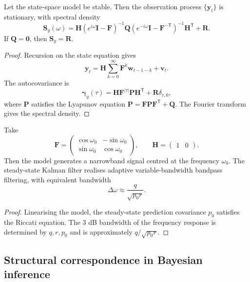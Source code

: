 \begin{theorem}\label{thm:kalman_spectrum}
Let the state-space model be stable. Then the observation process $\{\mathbf y_t\}$ is stationary, with spectral density
\[
\mathbf S_y(\omega)=\mathbf H(e^{i\omega}\mathbf I-\mathbf F)^{-1}\mathbf Q(e^{-i\omega}\mathbf I-\mathbf F^{-\mathsf T})^{-1}\mathbf H^{\mathsf T}+\mathbf R.
\]
If $\mathbf Q=\mathbf 0$, then $\mathbf S_y=\mathbf R$.
\end{theorem}

\begin{proof}
Recursion on the state equation gives
\[
\mathbf y_t=\mathbf H\sum_{k=0}^{\infty}\mathbf F^k\mathbf w_{t-1-k}+\mathbf v_t.
\]
The autocovariance is
\[
\boldsymbol\gamma_y(\tau)=\mathbf H\mathbf F^{|\tau|}\mathbf P\mathbf H^{\mathsf T}+\mathbf R\delta_{\tau,0},
\]
where $\mathbf P$ satisfies the Lyapunov equation $\mathbf P=\mathbf F\mathbf P\mathbf F^{\mathsf T}+\mathbf Q$. The Fourier transform gives the spectral density.
\end{proof}

\begin{proposition}\label{prop:kalman_periodic_extraction}
Take
\[
\mathbf F=\begin{pmatrix}\cos\omega_0&-\sin\omega_0\\ \sin\omega_0&\cos\omega_0\end{pmatrix},\qquad
\mathbf H=\begin{pmatrix}1&0\end{pmatrix}.
\]
Then the model generates a narrowband signal centred at the frequency $\omega_0$. The steady-state Kalman filter realises adaptive variable-bandwidth bandpass filtering, with equivalent bandwidth
\[
\Delta\omega\approx \frac{q}{\sqrt{p_0r}}.
\]
\end{proposition}

\begin{proof}
Linearising the model, the steady-state prediction covariance $p_0$ satisfies the Riccati equation. The $3$ dB bandwidth of the frequency response is determined by $q,r,p_0$ and is approximately $q/\sqrt{p_0r}$.
\end{proof}

\subsection{Structural correspondence in Bayesian inference}

